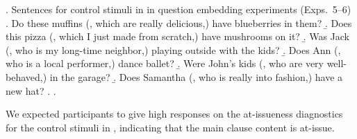 \documentclass[times,linguex]{glossa}
\begin{document}
\ex. Sentences for control stimuli in in question embedding experiments (Exps.~5--6)
\a. Do these muffins (, which are really delicious,) have blueberries in them?
\b. Does this pizza (, which I just made from scratch,) have mushrooms on it? 
\b. Was Jack (, who is my long-time neighbor,) playing outside with the kids? 
\b. Does Ann (, who is a local performer,) dance ballet?
\b. Were John's kids (, who are very well-behaved,) in the garage?
\b. Does Samantha (, who is really into fashion,) have a new hat?
\z.
\z.

We expected participants to give high responses on the at-issueness diagnostics for the control stimuli in \Last, indicating that the main clause content is at-issue.

\end{document}
